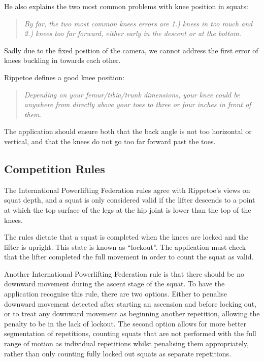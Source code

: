 He also explains the two most common problems with knee position in squats:

\begin{quote}
\emph{By far, the two most common knees errors are 1.) knees in too much and 2.) knees too far forward, either early in the descent or at the bottom.}
\end{quote}

Sadly due to the fixed position of the camera, we cannot address the first error of knees buckling in towards each other.

Rippetoe defines a good knee position:

\begin{quote}
\emph{Depending on your femur/tibia/trunk dimensions, your knee could be anywhere from directly above your toes to three or four inches in front of them.}
\end{quote}

The application should ensure both that the back angle is not too horizontal or vertical, and that the knees do not go too far forward past the toes.

\subsection{Competition Rules}

The International Powerlifting Federation rules\cite{ipf} agree with Rippetoe's views on squat depth, and a squat is only considered valid if the lifter descends to a point at which the top surface of the legs at the hip joint is lower than the top of the knees.

The rules dictate that a squat is completed when the knees are locked and the lifter is upright. This state is known as ``lockout''. The application must check that the lifter completed the full movement in order to count the squat as valid.

Another International Powerlifting Federation rule is that there should be no downward movement during the ascent stage of the squat. To have the application recognise this rule, there are two options. Either to penalise downward movement detected after starting an ascension and before locking out, or to treat any downward movement as beginning another repetition, allowing the penalty to be in the lack of lockout. The second option allows for more better segmentation of repetitions, counting squats that are not performed with the full range of motion as individual repetitions whilst penalising them appropriately, rather than only counting fully locked out squats as separate repetitions.